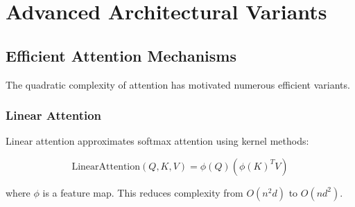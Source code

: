 
\section{Advanced Architectural Variants}

\subsection{Efficient Attention Mechanisms}

The quadratic complexity of attention has motivated numerous efficient variants.

\subsubsection{Linear Attention}

Linear attention approximates softmax attention using kernel methods:

\begin{equation}
\text{LinearAttention}(Q, K, V) = \phi(Q)(\phi(K)^T V)
\end{equation}

where $\phi$ is a feature map. This reduces complexity from $O(n^2d)$ to $O(nd^2)$.

